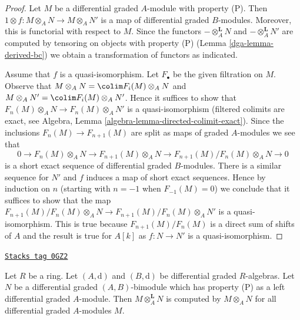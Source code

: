 \begin{proof}

Let $M$ be a differential graded $A$-module with property (P).
Then $1 \otimes f : M \otimes_A N \to M \otimes_A N'$ is a
map of differential graded $B$-modules. Moreover, this is functorial
with respect to $M$. Since the functors
$- \otimes_A^\mathbf{L} N$ and $- \otimes_A^\mathbf{L} N'$ are
computed by tensoring on objects with property (P)
(Lemma \ref{dga-lemma-derived-bc}) we obtain a transformation of functors
as indicated.

\medskip\noindent
Assume that $f$ is a quasi-isomorphism. Let $F_\bullet$ be the
given filtration on $M$. Observe that
$M \otimes_A N = \colim F_i(M) \otimes_A N$ and
$M \otimes_A N' = \colim F_i(M) \otimes_A N'$.
Hence it suffices to show that
$F_n(M) \otimes_A N \to F_n(M) \otimes_A N'$
is a quasi-isomorphism (filtered colimits are exact, see
Algebra, Lemma \ref{algebra-lemma-directed-colimit-exact}).
Since the inclusions $F_n(M) \to F_{n + 1}(M)$
are split as maps of graded $A$-modules we see that
$$
0 \to F_n(M) \otimes_A N \to F_{n + 1}(M) \otimes_A N \to
F_{n + 1}(M)/F_n(M) \otimes_A N \to 0
$$
is a short exact sequence of differential graded $B$-modules.
There is a similar sequence for $N'$ and $f$ induces a map
of short exact sequences. Hence by induction on $n$ (starting with $n = -1$
when $F_{-1}(M) = 0$) we conclude that it suffices to show that
the map $F_{n + 1}(M)/F_n(M) \otimes_A N \to F_{n + 1}(M)/F_n(M) \otimes_A N'$
is a quasi-isomorphism. This is true because $F_{n + 1}(M)/F_n(M)$
is a direct sum of shifts of $A$ and the result is true for $A[k]$
as $f : N \to N'$ is a quasi-isomorphism.
\end{proof}

\begin{lemma}[Compute bc]
\label{dga-lemma-compute-bc}
\href{https://stacks.math.columbia.edu/tag/0GZ2}{\texttt{Stacks tag 0GZ2}}

Let $R$ be a ring. Let $(A, \text{d})$ and $(B, \text{d})$ be
differential graded $R$-algebras. Let $N$ be a differential graded
$(A, B)$-bimodule which has property (P) as a left differential graded
$A$-module. Then $M \otimes_A^\mathbf{L} N$ is computed by
$M \otimes_A N$ for all differential graded $A$-modules $M$.
\end{lemma}

